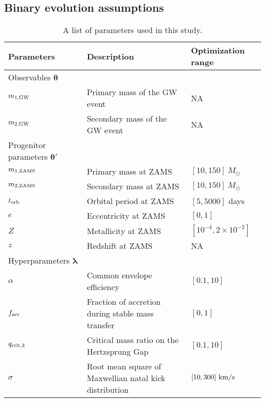 \documentclass[linenumbers,twocolumn]{aastex631}
\begin{document}
\subsection{Binary evolution assumptions}
\label{subsec:binaries}

\begin{table*}[hbt!]
    \begin{center}
    \begin{tabular}{ l l l }
    \hline
    \hline
    Parameters &  Description & Optimization range\\
    \hline
    \hline
    Observables $\bm{\theta}$ &\ &\  \\
    \hline
    \hline
    $m_{\rm 1, GW}$ & Primary mass of the GW event & NA \\
    $m_{\rm 2, GW}$ & Secondary mass of the GW event  & NA\\
    \hline
    \hline
    Progenitor parameters $\bm{\theta'}$&\ &\  \\
    \hline
    \hline
    $m_{\rm 1, ZAMS}$ & Primary mass at ZAMS & $[10,150]\ M_{\odot}$\\
    $m_{\rm 2, ZAMS}$ & Secondary mass at ZAMS & $[10,150]\ M_{\odot}$\\
    $t_{\rm orb}$ & Orbital period at ZAMS & $[5,5000]$ days\\
    $e$ & Eccentricity at ZAMS & $[0,1]$\\
    $Z$ & Metallicity at ZAMS & $[10^{-4},2\times10^{-2}]$\\
    $z$ & Redshift at ZAMS & NA\\
    \hline
    \hline
    Hyperparameters $\bm{\lambda    }$ &\ &\ \\
    \hline
    \hline

    $\alpha$ & Common envelope efficiency & $[0.1,10]$\\
    $f_{\rm acc}$ & Fraction of accretion during stable mass transfer &
    $[0,1]$\\
    $q_{\rm crit,3}$ & Critical mass ratio on the Hertzsprung Gap & $[0.1,10]$\\
    $\sigma$ & Root mean square of Maxwellian natal kick distribution&
    $[10,300]\ {\rm km/s}$\\


    \hline
    \hline
    \end{tabular}
    \caption{A list of parameters used in this study.}
    \label{tab:parameters}
    \end{center}
\end{table*}
\end{document}
